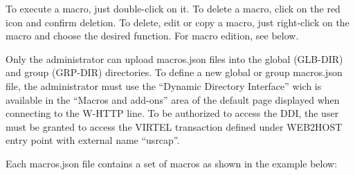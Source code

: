 \documentclass[letterpaper,10pt,english]{sphinxmanual}
\begin{document}


To execute a macro, just double-click on it. To delete a macro, click on the red icon and confirm deletion. To delete, edit
or copy a macro, just right-click on the macro and choose the desired function. For macro edition, see {\hyperref[\detokenize{User_Guide:v457ug-macro-commands}]{}} below.


Only the administrator can upload macros.json files into the global (GLB-DIR) and group (GRP-DIR) directories.
To define a new global or group macros.json file, the administrator must use the “Dynamic Directory Interface” wich is
available in the “Macros and add-ons” area of the default page displayed when connecting to the W-HTTP line. To be
authorized to access the DDI, the user must be granted to access the VIRTEL transaction defined under WEB2HOST
entry point with external name “usrcap”.


Each macros.json file contains a set of macros as shown in the example below:

\begin{sphinxVerbatim}[commandchars=\\\{\}]
 \PYG{p}{[}
\PYG{p}{[}\PYG{p}{]}
\PYG{p}{[}\PYG{p}{]}
\PYG{p}{]}
\end{sphinxVerbatim}
\end{document}
